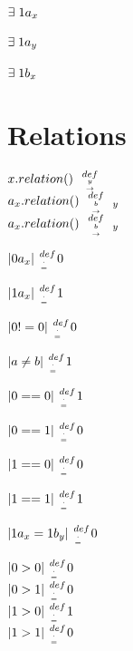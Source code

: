 \documentclass[11pt]{article}
\newcommand{\relationdef}[1]{ \hspace{2mm} { def \atop {#1 \atop \rightarrow }  } \hspace{2mm}}
\def \attrdef{ {\hspace{1mm} def \atop {. \atop = } \hspace{1mm}} }
\begin{document}
\begin{center}
$
\exists \hspace{1mm} 1a_x
$
\end{center}
\begin{center}
$
\exists \hspace{1mm} 1a_y
$
\end{center}
\begin{center}
$
\exists \hspace{1mm} 1b_x
$
\end{center}
\section{Relations}
\begin{center}
$
x.relation() \relationdef y
$
\\ \vspace{6mm}
$
a_x.relation() \relationdef b_y
$
\\ \vspace{6mm}
$
a_x.relation() \relationdef b_y
$
\end{center}

\begin{center}
$
|0a_x| \attrdef 0
$
\end{center}
\begin{center}
$
|1a_x| \attrdef 1
$
\end{center}
\begin{center}
$
|0 != 0| \attrdef 0
$
\end{center}
%
\begin{center}
$
|a \neq b| \attrdef 1
$
\end{center}
\begin{center}
$
|0==0| \attrdef 1
$
\end{center}
\begin{center}
$
|0==1| \attrdef 0
$
\end{center}
\begin{center}
$
|1==0| \attrdef 0
$
\end{center}
\begin{center}
$
|1==1| \attrdef 1
$
\end{center}

% 
\begin{center}
$
|1a_x = 1b_y| \attrdef 0
$
\end{center}
\begin{center}
$
|0 > 0| \attrdef 0
$
\\ \vspace{4mm}
$
|0 > 1| \attrdef 0
$
\\ \vspace{4mm}
$
|1 > 0| \attrdef 1
$
\\ \vspace{4mm}
$
|1 > 1| \attrdef 0
$
\end{center}
\end{document}
